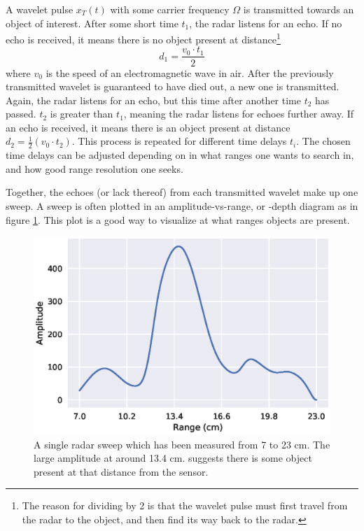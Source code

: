 A wavelet pulse $x_T(t)$ with some carrier frequency $\Omega$  is transmitted towards an object of interest. After some short time $t_1$, the radar listens for an echo. If no echo is received, it means there is no object present at distance\footnote{The reason for dividing by 2 is that the wavelet pulse must first travel from the radar to the object, and then find its way back to the radar.}
\begin{equation}
	d_1 = \frac{v_0\cdot t_1}2
\end{equation}
where $v_0$ is the speed of an electromagnetic wave in air. After the previously transmitted wavelet is guaranteed to have died out, a new one is transmitted. Again, the radar listens for an echo, but this time after another time $t_2$ has passed. $t_2$ is greater than $t_1$, meaning the radar listens for echoes further away. If an echo is received, it means there is an object present at distance 
$
	d_2 = \frac12(v_0\cdot t_2).
$
This process is repeated for different time delays $t_i$. The chosen time delays can be adjusted depending on in what ranges one wants to search in, and how good range resolution one seeks.

Together, the echoes (or lack thereof) from each transmitted wavelet make up one sweep. A sweep is often plotted in an amplitude-vs-range, or -depth diagram as in figure \ref{fig:single_sweep}. This plot is a good way to visualize at what ranges objects are present.

\begin{figure}[h]
	\centering
	\includegraphics[scale=0.8]{figs_temp/single_sweep}
	\caption{A single radar sweep which has been measured from 7 to 23 cm. The large amplitude at around 13.4 cm. suggests there is some object present at that distance from the sensor.}
	\label{fig:single_sweep}
\end{figure}

